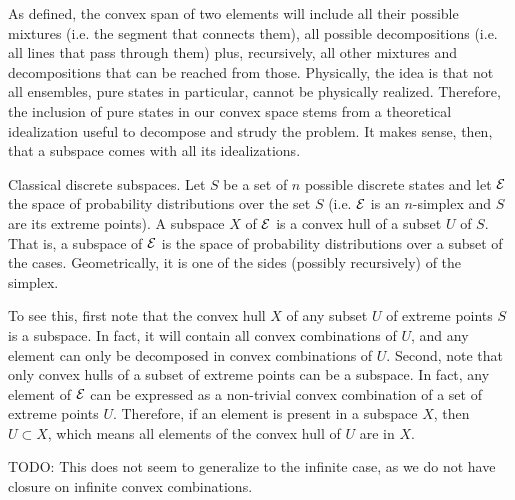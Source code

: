 \begin{remark}
	As defined, the convex span of two elements will include all their possible mixtures (i.e. the segment that connects them), all possible decompositions (i.e. all lines that pass through them) plus, recursively, all other mixtures and decompositions that can be reached from those. Physically, the idea is that not all ensembles, pure states in particular, cannot be physically realized. Therefore, the inclusion of pure states in our convex space stems from a theoretical idealization useful to decompose and strudy the problem. It makes sense, then, that a subspace comes with all its idealizations.
\end{remark}

\begin{example} Classical discrete subspaces.
	Let $S$ be a set of $n$ possible discrete states and let $\mathcal{E}$ the space of probability distributions over the set $S$ (i.e. $\mathcal{E}$ is an $n$-simplex and $S$ are its extreme points). A subspace $X$ of $\mathcal{E}$ is a convex hull of a subset $U$ of $S$. That is, a subspace of $\mathcal{E}$ is the space of probability distributions over a subset of the cases. Geometrically, it is one of the sides (possibly recursively) of the simplex.
	
	To see this, first note that the convex hull $X$ of any subset $U$ of extreme points $S$ is a subspace. In fact, it will contain all convex combinations of $U$, and any element can only be decomposed in convex combinations of $U$. Second, note that only convex hulls of a subset of extreme points can be a subspace. In fact, any element of $\mathcal{E}$ can be expressed as a non-trivial convex combination of a set of extreme points $U$. Therefore, if an element is present in a subspace $X$, then $U \subset X$, which means all elements of the convex hull of $U$ are in $X$.
	
	TODO: This does not seem to generalize to the infinite case, as we do not have closure on infinite convex combinations.
\end{example}

